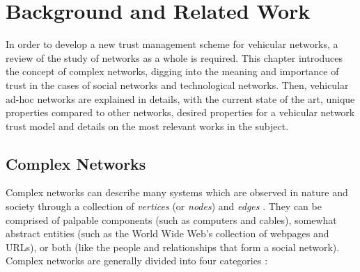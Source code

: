 \chapter{Background and Related Work}
\label{chap:complexnetworks}

In order to develop a new trust management scheme for vehicular networks, a review of the study of networks as a whole is required.
This chapter introduces the concept of complex networks, digging into the meaning and importance of trust in the cases of social networks and technological networks.
Then, vehicular ad-hoc networks are explained in details, with the current state of the art, unique properties compared to other networks, desired properties for a vehicular network trust model and details on the most relevant works in the subject.

\section {Complex Networks}

%


Complex networks can describe many systems which are observed in nature and society through a collection of \textit{vertices} (or \textit{nodes}) and \textit{edges} \citep{newmannetworks}.
They can be comprised of palpable components (such as computers and cables), somewhat abstract entities (such as the World Wide Web's collection of webpages and URLs), or both (like the people and relationships that form a social network).
Complex networks are generally divided into four categories \citep{newmannetworks}:

